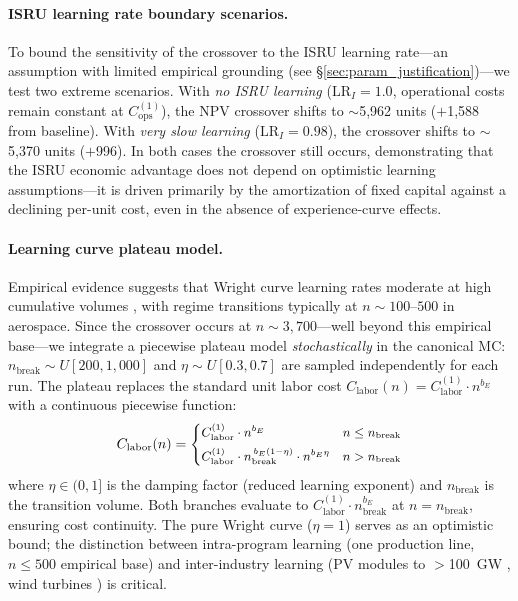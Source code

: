 \documentclass[5p,twocolumn]{elsarticle}
\begin{document}
\paragraph{ISRU learning rate boundary scenarios.} To bound the sensitivity of the crossover to the ISRU learning rate---an assumption with limited empirical grounding (see \S\ref{sec:param_justification})---we test two extreme scenarios. With \emph{no ISRU learning} ($\mathrm{LR}_I = 1.0$, operational costs remain constant at $C_{\mathrm{ops}}^{(1)}$), the NPV crossover shifts to $\sim$5{,}962 units ($+$1{,}588 from baseline). With \emph{very slow learning} ($\mathrm{LR}_I = 0.98$), the crossover shifts to $\sim$5{,}370 units ($+$996). In both cases the crossover still occurs, demonstrating that the ISRU economic advantage does not depend on optimistic learning assumptions---it is driven primarily by the amortization of fixed capital against a declining per-unit cost, even in the absence of experience-curve effects.

\paragraph{Learning curve plateau model.} Empirical evidence suggests that Wright curve learning rates moderate at high cumulative volumes \cite{argote1990,thompson2012,benkard2000}, with regime transitions typically at $n \sim 100$--$500$ in aerospace. Since the crossover occurs at $n \sim 3{,}700$---well beyond this empirical base---we integrate a piecewise plateau model \emph{stochastically} in the canonical MC: $n_{\mathrm{break}} \sim U[200, 1{,}000]$ and $\eta \sim U[0.3, 0.7]$ are sampled independently for each run. The plateau replaces the standard unit labor cost $C_{\mathrm{labor}}(n) = C_{\mathrm{labor}}^{(1)} \cdot n^{b_E}$ with a continuous piecewise function:
\begin{equation}\small
  C_{\mathrm{labor}}(n) = \begin{cases}
    C_{\mathrm{labor}}^{(1)} \cdot n^{b_E} & n \leq n_{\mathrm{break}} \\[4pt]
    C_{\mathrm{labor}}^{(1)} \cdot n_{\mathrm{break}}^{\,b_E(1-\eta)} \cdot n^{b_E \eta} & n > n_{\mathrm{break}}
  \end{cases}
\end{equation}
where $\eta \in (0,1]$ is the damping factor (reduced learning exponent) and $n_{\mathrm{break}}$ is the transition volume. Both branches evaluate to $C_{\mathrm{labor}}^{(1)} \cdot n_{\mathrm{break}}^{b_E}$ at $n = n_{\mathrm{break}}$, ensuring cost continuity. The pure Wright curve ($\eta = 1$) serves as an optimistic bound; the distinction between intra-program learning (one production line, $n \leq 500$ empirical base) and inter-industry learning (PV modules to $>$100~GW \cite{kavlak2018}, wind turbines \cite{rubin2015}) is critical.
\end{document}
